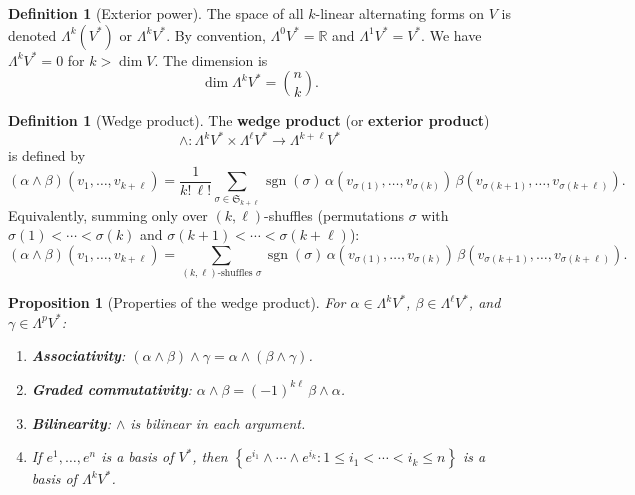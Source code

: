 \documentclass[12pt,a4paper,openany]{book}
\newtheorem{proposition}[theorem]{Proposition}
\theoremstyle{definition}
\newtheorem{definition}[theorem]{Definition}
\theoremstyle{remark}
\newcommand{\R}{\mathbb{R}}
\newcommand{\set}[1]{\left\{ #1 \right\}}
\begin{document}
\begin{definition}[Exterior power]\label{def:exterior-power}
The space of all $k$-linear alternating forms on $V$ is denoted
$\Lambda^k(V^*)$ or $\Lambda^k V^*$. By convention, $\Lambda^0 V^* = \R$
and $\Lambda^1 V^* = V^*$. We have $\Lambda^k V^* = 0$ for $k > \dim V$.
The dimension is
\[
  \dim \Lambda^k V^* = \binom{n}{k}.
\]
\end{definition}

\begin{definition}[Wedge product]\label{def:wedge-product}
The \textbf{wedge product} (or \textbf{exterior product})
\[
  \wedge \colon \Lambda^k V^* \times \Lambda^\ell V^*
    \longrightarrow \Lambda^{k+\ell} V^*
\]
is defined by
\[
  (\alpha \wedge \beta)(v_1, \ldots, v_{k+\ell})
    = \frac{1}{k!\,\ell!} \sum_{\sigma \in \mathfrak{S}_{k+\ell}}
      \operatorname{sgn}(\sigma)\,
      \alpha(v_{\sigma(1)}, \ldots, v_{\sigma(k)})\,
      \beta(v_{\sigma(k+1)}, \ldots, v_{\sigma(k+\ell)}).
\]
Equivalently, summing only over $(k,\ell)$-shuffles (permutations
$\sigma$ with $\sigma(1) < \cdots < \sigma(k)$ and
$\sigma(k+1) < \cdots < \sigma(k+\ell)$):
\[
  (\alpha \wedge \beta)(v_1, \ldots, v_{k+\ell})
    = \sum_{\text{$(k,\ell)$-shuffles } \sigma}
      \operatorname{sgn}(\sigma)\,
      \alpha(v_{\sigma(1)}, \ldots, v_{\sigma(k)})\,
      \beta(v_{\sigma(k+1)}, \ldots, v_{\sigma(k+\ell)}).
\]
\end{definition}

\begin{proposition}[Properties of the wedge product]\label{prop:wedge-properties}
For $\alpha \in \Lambda^k V^*$, $\beta \in \Lambda^\ell V^*$, and
$\gamma \in \Lambda^p V^*$:
\begin{enumerate}[label=(\roman*)]
  \item \textbf{Associativity}: $(\alpha \wedge \beta) \wedge \gamma
    = \alpha \wedge (\beta \wedge \gamma)$.
  \item \textbf{Graded commutativity}: $\alpha \wedge \beta
    = (-1)^{k\ell}\, \beta \wedge \alpha$.
  \item \textbf{Bilinearity}: $\wedge$ is bilinear in each argument.
  \item If $e^1, \ldots, e^n$ is a basis of $V^*$, then
    $\set{e^{i_1} \wedge \cdots \wedge e^{i_k} : 1 \leq i_1 < \cdots < i_k \leq n}$
    is a basis of $\Lambda^k V^*$.
\end{enumerate}
\end{proposition}
\end{document}
